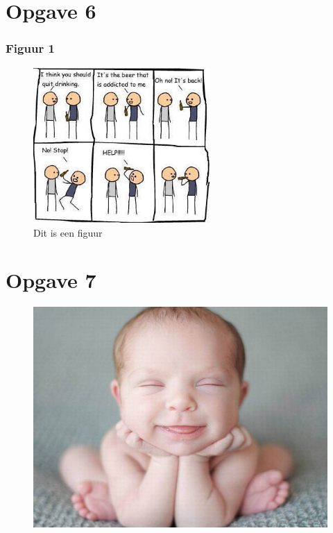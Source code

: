 \documentclass{beamer}
\begin{document}
\section{Opgave 6}
\begin{frame}
	\frametitle{Figuur 1}
	
	\begin{figure}
		\centering
			\includegraphics[width=0.6\textwidth]{figure.jpg}
		\caption{Dit is een figuur}
		\label{fig:figure}
	\end{figure}
	
\end{frame}

\section{Opgave 7}
\begin{frame}[plain]
	
	\begin{figure}
		\centering
			\includegraphics[width=1.00\textwidth]{baby.jpg}
		\label{fig:baby}
	\end{figure}
	
\end{frame}
\end{document}
